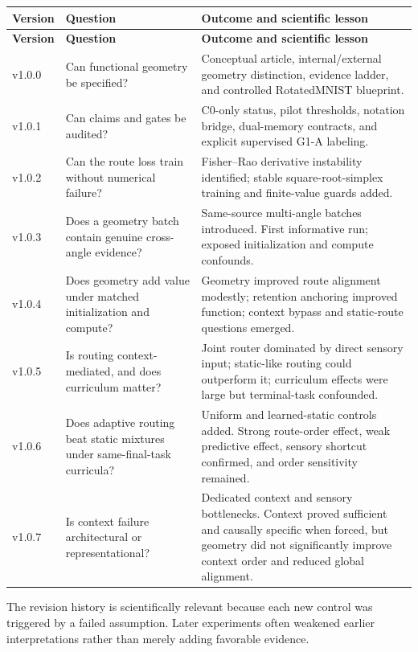\documentclass[11pt,a4paper]{article}
\begin{document}
\begin{longtable}{p{1.4cm}p{4.0cm}p{8.2cm}}
\toprule
\textbf{Version} & \textbf{Question} & \textbf{Outcome and scientific lesson}\\
\midrule
\endfirsthead
\toprule
\textbf{Version} & \textbf{Question} & \textbf{Outcome and scientific lesson}\\
\midrule
\endhead
v1.0.0 & Can functional geometry be specified? & Conceptual article, internal/external geometry distinction, evidence ladder, and controlled RotatedMNIST blueprint.\\
v1.0.1 & Can claims and gates be audited? & C0-only status, pilot thresholds, notation bridge, dual-memory contracts, and explicit supervised G1-A labeling.\\
v1.0.2 & Can the route loss train without numerical failure? & Fisher--Rao derivative instability identified; stable square-root-simplex training and finite-value guards added.\\
v1.0.3 & Does a geometry batch contain genuine cross-angle evidence? & Same-source multi-angle batches introduced. First informative run; exposed initialization and compute confounds.\\
v1.0.4 & Does geometry add value under matched initialization and compute? & Geometry improved route alignment modestly; retention anchoring improved function; context bypass and static-route questions emerged.\\
v1.0.5 & Is routing context-mediated, and does curriculum matter? & Joint router dominated by direct sensory input; static-like routing could outperform it; curriculum effects were large but terminal-task confounded.\\
v1.0.6 & Does adaptive routing beat static mixtures under same-final-task curricula? & Uniform and learned-static controls added. Strong route-order effect, weak predictive effect, sensory shortcut confirmed, and order sensitivity remained.\\
v1.0.7 & Is context failure architectural or representational? & Dedicated context and sensory bottlenecks. Context proved sufficient and causally specific when forced, but geometry did not significantly improve context order and reduced global alignment.\\
\bottomrule
\end{longtable}

The revision history is scientifically relevant because each new control was triggered by a failed assumption. Later experiments often weakened earlier interpretations rather than merely adding favorable evidence.
\end{document}
